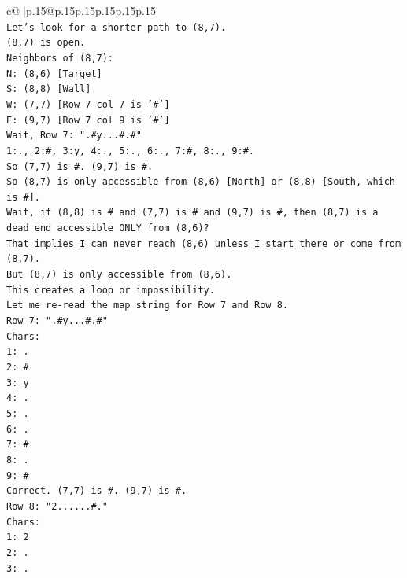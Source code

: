 \documentclass{article}
\begin{document}
{\begin{supertabular}{c@{$\;$}|p{.15\linewidth}@{}p{.15\linewidth}p{.15\linewidth}p{.15\linewidth}p{.15\linewidth}p{.15\linewidth}}
{{{\\ 
\texttt{Let's look for a shorter path to (8,7).} \\
\texttt{(8,7) is open.} \\
\texttt{Neighbors of (8,7):} \\
\texttt{N: (8,6) {[}Target{]}} \\
\texttt{S: (8,8) {[}Wall{]}} \\
\texttt{W: (7,7) {[}Row 7 col 7 is '\#'{]}} \\
\texttt{E: (9,7) {[}Row 7 col 9 is '\#'{]}} \\
\texttt{Wait, Row 7: ".\#y...\#.\#"} \\
\texttt{1:., 2:\#, 3:y, 4:., 5:., 6:., 7:\#, 8:., 9:\#.} \\
\texttt{So (7,7) is \#. (9,7) is \#.} \\
\texttt{So (8,7) is only accessible from (8,6) {[}North{]} or (8,8) {[}South, which is \#{]}.} \\
\texttt{Wait, if (8,8) is \# and (7,7) is \# and (9,7) is \#, then (8,7) is a dead end accessible ONLY from (8,6)?} \\
\texttt{That implies I can never reach (8,6) unless I start there or come from (8,7).} \\
\texttt{But (8,7) is only accessible from (8,6).} \\
\texttt{This creates a loop or impossibility.} \\
\texttt{Let me re{-}read the map string for Row 7 and Row 8.} \\
\texttt{Row 7: ".\#y...\#.\#"} \\
\texttt{Chars:} \\
\texttt{1: .} \\
\texttt{2: \#} \\
\texttt{3: y} \\
\texttt{4: .} \\
\texttt{5: .} \\
\texttt{6: .} \\
\texttt{7: \#} \\
\texttt{8: .} \\
\texttt{9: \#} \\
\texttt{Correct. (7,7) is \#. (9,7) is \#.} \\
\texttt{Row 8: "2......\#."} \\
\texttt{Chars:} \\
\texttt{1: 2} \\
\texttt{2: .} \\
\texttt{3: .} \\
}}}
\end{supertabular}}
\end{document}
